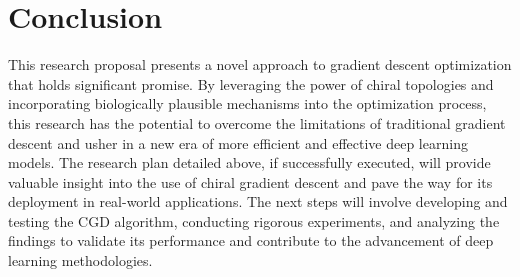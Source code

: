 \documentclass[12pt, a4paper]{article}
\begin{document}
\section{Conclusion}
This research proposal presents a novel approach to gradient descent optimization that holds significant promise. By leveraging the power of chiral topologies and incorporating biologically plausible mechanisms into the optimization process, this research has the potential to overcome the limitations of traditional gradient descent and usher in a new era of more efficient and effective deep learning models. The research plan detailed above, if successfully executed, will provide valuable insight into the use of chiral gradient descent and pave the way for its deployment in real-world applications. The next steps will involve developing and testing the CGD algorithm, conducting rigorous experiments, and analyzing the findings to validate its performance and contribute to the advancement of deep learning methodologies.


 
\end{document}
